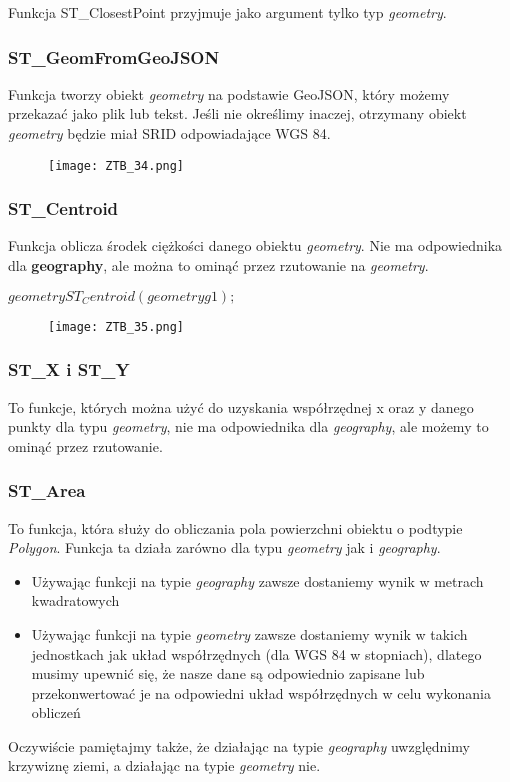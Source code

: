 \documentclass[a4paper,15pt]{article}
\newcommand{\example}[2]{
    \begin{tcolorbox}[colback=blue!5!white,colframe=blue,title={Przykład #1}]
        #2
    \end{tcolorbox}
}
\begin{document}
Funkcja ST\_ClosestPoint przyjmuje jako argument tylko typ \textit{geometry}. 

\subsubsection{ST\_GeomFromGeoJSON}
Funkcja tworzy obiekt \textit{geometry} na podstawie GeoJSON, który możemy przekazać jako plik lub tekst. Jeśli nie określimy inaczej, otrzymany obiekt \textit{geometry} będzie miał SRID odpowiadające WGS 84.

\example{}{
\begin{figure}[H]
\centering
  \texttt{[image: ZTB\_34.png]}
\end{figure}
}

\subsubsection{ST\_Centroid}
Funkcja oblicza środek ciężkości danego obiektu \textit{geometry}. Nie ma odpowiednika dla \textbf{geography}, ale można to ominąć przez rzutowanie na \textit{geometry}.

$geometry ST_Centroid(geometry g1);$

\begin{figure}[H]
\centering
  \texttt{[image: ZTB\_35.png]}
\end{figure}


\subsubsection{ST\_X i ST\_Y}

To funkcje, których można użyć do uzyskania współrzędnej x oraz y danego punkty dla typu \textit{geometry}, nie ma odpowiednika dla \textit{geography}, ale możemy to ominąć przez rzutowanie.


\subsubsection{ST\_Area}

To funkcja, która służy do obliczania pola powierzchni obiektu o podtypie \textit{Polygon}. Funkcja ta działa zarówno dla typu \textit{geometry} jak i \textit{geography}. 
\begin{itemize}
\item Używając funkcji na typie \textit{geography} zawsze dostaniemy wynik w metrach kwadratowych
\item Używając funkcji na typie \textit{geometry} zawsze dostaniemy wynik w takich jednostkach jak układ współrzędnych (dla WGS 84 w stopniach), dlatego musimy upewnić się, że nasze dane są odpowiednio zapisane lub przekonwertować je na odpowiedni układ współrzędnych w celu wykonania obliczeń
\end{itemize}
Oczywiście pamiętajmy także, że działając na typie \textit{geography} uwzględnimy krzywiznę ziemi, a działając na typie \textit{geometry} nie. 
\end{document}
